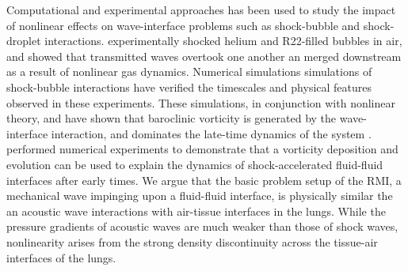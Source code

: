 \documentclass{article}
\begin{document}
Computational and experimental approaches has been used to study the
impact of nonlinear effects on wave-interface problems such as
shock-bubble and shock-droplet interactions. \cite{Haast1987}
experimentally shocked helium and R22-filled bubbles in air, and
showed that transmitted waves overtook one another an merged
downstream as a result of nonlinear gas dynamics. Numerical
simulations simulations of shock-bubble interactions have verified the
timescales and physical features observed in these experiments. These
simulations, in conjunction with nonlinear theory, and have shown that
baroclinic vorticity is generated by the wave-interface interaction,
and dominates the late-time dynamics of the system
\citep{Picone1988,Quirk2006}. \cite{Hawley1989} performed numerical
experiments to demonstrate that a vorticity deposition and evolution
can be used to explain the dynamics of shock-accelerated fluid-fluid
interfaces after early times. We argue that the basic problem setup of
the \ac{RMI}, a mechanical wave impinging upon a fluid-fluid
interface, is physically similar the an acoustic wave interactions
with air-tissue interfaces in the lungs. While the pressure gradients
of acoustic waves are much weaker than those of shock waves,
nonlinearity arises from the strong density discontinuity across the
tissue-air interfaces of the lungs.
\end{document}

